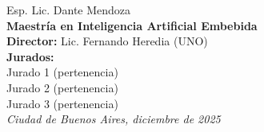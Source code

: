 \begin{titlepage}
\begin{flushright}
        {\fontsize{20pt}{25pt}\selectfont
        Esp. Lic. Dante Mendoza} \\[1cm]

        {\fontsize{15pt}{20pt}\selectfont
        \textbf{Maestría en Inteligencia Artificial Embebida} %
        } \\ [2cm] 

        {\fontsize{11pt}{15pt}\selectfont
        \textbf{Director:} Lic. Fernando Heredia (UNO)} \\[1cm]

        {\fontsize{11pt}{15pt}\selectfont
        \textbf{Jurados:}} \\[0.5cm]
        {\fontsize{11pt}{15pt}\selectfont
        Jurado 1 (pertenencia)} \\ 
        {\fontsize{11pt}{15pt}\selectfont
        Jurado 2 (pertenencia)} \\ 
        {\fontsize{11pt}{15pt}\selectfont
        Jurado 3 (pertenencia)} \\[1cm]

        {\itshape\fontsize{10pt}{12pt}\selectfont
        Ciudad de Buenos Aires, diciembre de 2025} %
    \end{flushright}
\end{titlepage}
